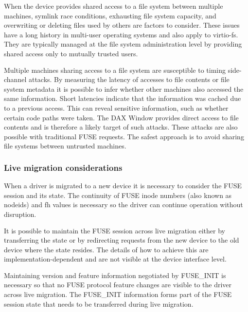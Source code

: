 When the device provides shared access to a file system between multiple
machines, symlink race conditions, exhausting file system capacity, and
overwriting or deleting files used by others are factors to consider.  These
issues have a long history in multi-user operating systems and also apply to
virtio-fs.  They are typically managed at the file system administration level
by providing shared access only to mutually trusted users.

Multiple machines sharing access to a file system are susceptible to timing
side-channel attacks.  By measuring the latency of accesses to file contents or
file system metadata it is possible to infer whether other machines also
accessed the same information.  Short latencies indicate that the information
was cached due to a previous access.  This can reveal sensitive information,
such as whether certain code paths were taken.  The DAX Window provides direct
access to file contents and is therefore a likely target of such attacks.
These attacks are also possible with traditional FUSE requests.  The safest
approach is to avoid sharing file systems between untrusted machines.

\subsubsection{Live migration considerations}\label{sec:Device Types / File System Device / Live Migration Considerations}

When a driver is migrated to a new device it is necessary to consider the FUSE
session and its state.  The continuity of FUSE inode numbers (also known as
nodeids) and fh values is necessary so the driver can continue operation
without disruption.

It is possible to maintain the FUSE session across live migration either by
transferring the state or by redirecting requests from the new device to the
old device where the state resides.  The details of how to achieve this are
implementation-dependent and are not visible at the device interface level.

Maintaining version and feature information negotiated by FUSE\_INIT is
necessary so that no FUSE protocol feature changes are visible to the driver
across live migration.  The FUSE\_INIT information forms part of the FUSE
session state that needs to be transferred during live migration.
